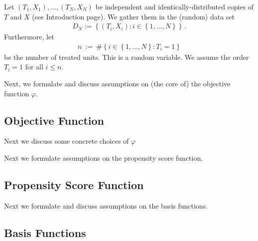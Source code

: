 Let $(T_1,X_1),\ldots,(T_N,X_N)$ be independent and identically-distributed copies of $T$ and $X$ (see Introduction page). 
We gather them in the (random) data set 
\begin{gather*}
D_N:=\left\{ (T_i,X_i)\colon i\in \left\{ 1,\ldots,N \right\} \right\}
\,.
\end{gather*}
Furthermore, let
\begin{gather*}
  n
  \ 
  :=
  \ 
  \# 
  \left\{ 
    i\in \left\{ 1,\ldots,N \right\}
    \colon
    T_i=1
  \right\}
\end{gather*}
be the number of treated units. This is a random variable. We assume the order $T_i=1$ for all $i\le n$.



Next, we formulate and discuss assumptions on (the core of) the objective function $\varphi$.
\subsection{Objective Function}


Next we discuss some concrete choices of $\varphi$



Next we formulate assumptions on the propensity score function.
\subsection{Propensity Score Function}



Next we formulate and discuss assumptions on the basis functions.
\subsection{Basis Functions}

